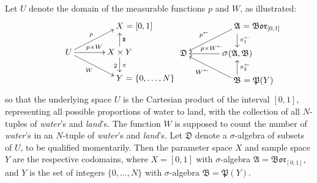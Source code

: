 \documentclass[
twoside=true,
paper=letter,
fontsize=11pt,
pagesize=auto,
leqno,
openany,
headsepline,
overfullrule,
]{scrbook}
\theoremstyle{plain}
\theoremstyle{plain}
\theoremstyle{definition}
\theoremstyle{bfnoteitalic}
\theoremstyle{bfnoteroman}
\newcommand{\sigalg}[1]{\mathfrak{#1}}
\newcommand{\borel}{\mathfrak{Bor}}
\newcommand{\sagb}{\mathop{\hbox{\large{$\sigma$}}}\nolimits}
\newcommand{\textsigma}{\hbox{\large{$\sigma$}}\kern-1pt}
\newcommand{\preimage}[1]{#1^{\leftarrow}}
\newcommand{\productsig}[2]{\sagb(#1,#2)}
\newcommand{\powerset}{\mathfrak{P}}
\newcommand{\measurespace}{X}
\newcommand{\measurespaceii}{Y}
\newcommand{\projectionone}{\pi_1}
\newcommand{\projectiontwo}{\pi_2}
\newcommand{\pspace}{\measurespace}%
\newcommand{\sspace}{\measurespaceii}%
\newcommand{\sspacesig}{\sigalg{B}}
\newcommand{\pspacesig}{\sigalg{A}}
\begin{document}
Let $U$ denote the domain of the measurable functions $p$ and $W$, as illustrated:
\[
\xymatrix@R=16pt@C=35pt{
 & \pspace \makebox[0pt][l]{$\ = [0,1]$}
 \\
 U
 \ar[ur]^{\makebox[0pt][r]{\scriptsize{$p$}}}
 \ar[dr]_{\makebox[0pt][r]{\scriptsize{$W$}}}
 \ar[r]^{p\times W} &
 \pspace\times\sspace \ar[u]_\projectionone \ar[d]^\projectiontwo
 \\
  & \sspace\rlap{ $=\{0,\ldots,N\}$} \\
}
%
\hspace{50pt}
%
\xymatrix@R=16pt@C=35pt{
 & \pspacesig \rlap{ $=\borel_{[0,1]}$}
 \ar[dl]_{\makebox[0pt][r]{\scriptsize{$\preimage{p}$}}}
 \ar[d]^{\preimage{\projectionone}}
 \\
 \sigalg{D}  & 
 \productsig{\pspacesig}{\sspacesig} 
 \ar[l]_{\ \preimage{p\times W}}
 \\
  & \sspacesig \rlap{ $=\powerset(\sspace)$}
  \ar[u]_{\preimage{\projectiontwo}}
  \ar[ul]^{\makebox[0pt][r]{\scriptsize{$\preimage{W}$}}}
  \\
}
\]
so that the underlying space  $U$ is the Cartesian product of the interval $[0,1]$, representing all possible proportions of water to land, with the collection of all $N$-tuples of \textit{water}'s and \textit{land}'s. The function $W$ is supposed to count the number of \textit{water}'s in an $N$-tuple of \textit{water}'s and \textit{land}'s.  Let 
$\sigalg{D}$ denote a \textsigma-algebra of subsets of $U$, to be qualified momentarily. Then 
the parameter space $\pspace$ and 
sample space $\sspace$ 
are the respective codomains, where $\pspace=[0,1]$ with \textsigma-algebra 
$\pspacesig = \borel_{[0,1]}$, and 
$\sspace$ is the set of integers $\{0,\ldots,N\}$ with \textsigma-algebra
$\sspacesig=\powerset(\sspace)$.
\end{document}
